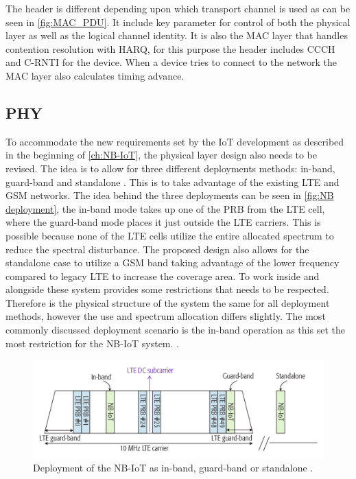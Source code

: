 The header is different depending upon which transport channel is used as can be seen in \autoref{fig:MAC_PDU}. It include key parameter for control of both the physical layer as well as the logical channel identity. It is also the \gls{MAC} layer that handles contention resolution with \gls{HARQ}, for this purpose the header includes \gls{CCCH} and \gls{C-RNTI} for the device. When a device tries to connect to the network the \gls{MAC} layer also calculates timing advance. 


\subsection{PHY}\label{sec:NB-IoT/Physical Layer}

To accommodate the new requirements set by the \gls{IoT} development as described in the beginning of \autoref{ch:NB-IoT}, the physical layer design also needs to be revised. The idea is to allow for three different deployments methods: in-band, guard-band and standalone \citep{primer}. This is to take advantage of the existing \gls{LTE} and \gls{GSM} networks. The idea behind the three deployments can be seen in \autoref{fig:NB deployment}, the in-band mode takes up one of the \gls{PRB} from the \gls{LTE} cell, where the guard-band mode places it just outside the LTE carriers. This is possible because none of the \gls{LTE} cells utilize the entire allocated spectrum to reduce the spectral disturbance. The proposed design also allows for the standalone case to utilize a \gls{GSM} band taking advantage of the lower frequency compared to legacy \gls{LTE} to increase the coverage area. To work inside and alongside these system provides some restrictions that needs to be respected. Therefore is the physical structure of the system the same for all deployment methods, however the use and spectrum allocation differs slightly. The most commonly discussed deployment scenario is the in-band operation as this set the most restriction for the \gls{NB-IoT} system. \citep{REL-13,primer}. 

\begin{figure}[H]
\centering
\includegraphics[width=\textwidth]{figures/deployment.png}
\caption{Deployment of the NB-IoT as in-band, guard-band or standalone \citep{primer}.}
\label{fig:NB deployment}
\end{figure}

